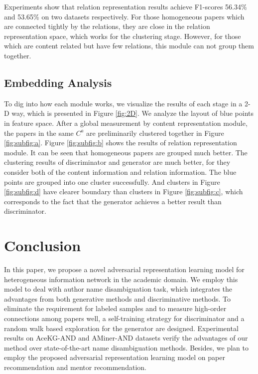 \documentclass[letterpaper]{article} %
\begin{document}
Experiments show that relation representation results achieve F1-scores 56.34\% and 53.65\% on two datasets respectively.
For those homogeneous papers which are connected tightly by the relations, they are close in the relation representation space, which works for the clustering stage. However, for those which are content related but have few relations, this module can not group them together.

\subsection{Embedding Analysis}
To dig into how each module works, we visualize the results of each stage in a 2-D way, which is presented in Figure \ref{fig:2D}.
We analyze the layout of blue points in feature space.
After a global measurement by content representation module, the papers in the same $C^a$ are preliminarily clustered together in Figure \ref{fig:subfig:a}.
Figure \ref{fig:subfig:b} shows the results of relation representation module. It can be seen that homogeneous papers are grouped much better.
The clustering results of discriminator and generator are much better, for they consider both of the content information and relation information.
The blue points are grouped into one cluster successfully.
And clusters in Figure \ref{fig:subfig:d} have clearer boundary than clusters in Figure \ref{fig:subfig:c}, which corresponds to the fact that the generator achieves a better result than discriminator.

\section{Conclusion}
In this paper, we propose a novel adversarial representation learning model for heterogeneous information network in the academic domain.
We employ this model to deal with author name disambiguation task, which integrates the advantages from both generative methods and discriminative methods.
To eliminate the requirement for labeled samples and to measure high-order connections among papers well, a self-training strategy for discriminator and a random walk based exploration for the generator are designed.
Experimental results on AceKG-AND and AMiner-AND datasets verify the advantages of our method over state-of-the-art name disambiguation methods.
Besides, we plan to employ the proposed adversarial representation learning model on paper recommendation and mentor recommendation.
\end{document}
